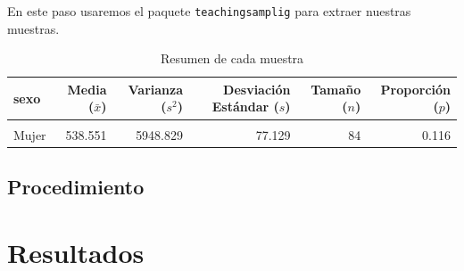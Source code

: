 \documentclass[
]{article}
\newenvironment{Shaded}{\begin{snugshade}}{\end{snugshade}}
\newcommand{\DecValTok}[1]{\textcolor[rgb]{0.00,0.00,0.81}{#1}}
\newcommand{\FunctionTok}[1]{\textcolor[rgb]{0.13,0.29,0.53}{\textbf{#1}}}
\newcommand{\NormalTok}[1]{#1}
\newcommand{\OtherTok}[1]{\textcolor[rgb]{0.56,0.35,0.01}{#1}}
\newcommand{\SpecialCharTok}[1]{\textcolor[rgb]{0.81,0.36,0.00}{\textbf{#1}}}
\newcommand{\StringTok}[1]{\textcolor[rgb]{0.31,0.60,0.02}{#1}}
\begin{document}
En este paso usaremos el paquete \texttt{teachingsamplig} para extraer
nuestras muestras.

\begin{Shaded}
\end{Shaded}

\begin{table}[!h]
\centering
\caption{\label{tab:tabla}Resumen de cada muestra}
\centering
\begin{tabular}[t]{lrrrrr}
\toprule
sexo & Media (\(\bar{x}\)) & Varianza (\(s^{2}\)) & Desviación Estándar (\(s\)) & Tamaño (\(n\)) & Proporción (\(p\))\\
\midrule
\cellcolor{gray!10}{Hombre} & \cellcolor{gray!10}{553.216} & \cellcolor{gray!10}{5884.149} & \cellcolor{gray!10}{76.708} & \cellcolor{gray!10}{76} & \cellcolor{gray!10}{0.105}\\
Mujer & 538.551 & 5948.829 & 77.129 & 84 & 0.116\\
\bottomrule
\end{tabular}
\end{table}

\subsection*{Procedimiento}\label{procedimiento}

\section*{Resultados}\label{resultados}
\end{document}
